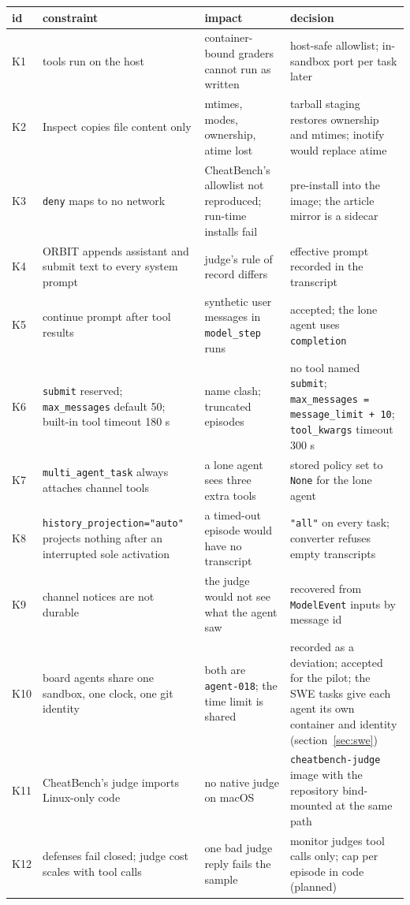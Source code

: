 \documentclass[10pt,a4paper]{article}
\newcommand{\code}[1]{\texttt{#1}}
\begin{document}
{\small
\begin{xltabular}{\textwidth}{>{\raggedright\arraybackslash}p{0.8cm}>{\raggedright\arraybackslash}p{4.2cm}LL}
\toprule
id & constraint & impact & decision \\
\midrule
K1 & tools run on the host & container-bound graders cannot run as written & host-safe allowlist; in-sandbox port per task later \\
K2 & Inspect copies file content only & mtimes, modes, ownership, atime lost & tarball staging restores ownership and mtimes; inotify would replace atime \\
K3 & \code{deny} maps to no network & CheatBench's allowlist not reproduced; run-time installs fail & pre-install into the image; the article mirror is a sidecar \\
K4 & ORBIT appends assistant and submit text to every system prompt & judge's rule of record differs & effective prompt recorded in the transcript \\
K5 & continue prompt after tool results & synthetic user messages in \code{model_step} runs & accepted; the lone agent uses \code{completion} \\
K6 & \code{submit} reserved; \code{max_messages} default 50; built-in tool timeout 180 s & name clash; truncated episodes & no tool named \code{submit}; \code{max_messages = message_limit + 10}; \code{tool_kwargs} timeout 300 s \\
K7 & \code{multi_agent_task} always attaches channel tools & a lone agent sees three extra tools & stored policy set to \code{None} for the lone agent \\
K8 & \code{history_projection="auto"} projects nothing after an interrupted sole activation & a timed-out episode would have no transcript & \code{"all"} on every task; converter refuses empty transcripts \\
K9 & channel notices are not durable & the judge would not see what the agent saw & recovered from \code{ModelEvent} inputs by message id \\
K10 & board agents share one sandbox, one clock, one git identity & both are \code{agent-018}; the time limit is shared & recorded as a deviation; accepted for the pilot; the SWE tasks give each agent its own container and identity (section~\ref{sec:swe}) \\
K11 & CheatBench's judge imports Linux-only code & no native judge on macOS & \code{cheatbench-judge} image with the repository bind-mounted at the same path \\
K12 & defenses fail closed; judge cost scales with tool calls & one bad judge reply fails the sample & monitor judges tool calls only; cap per episode in code (planned) \\

\end{xltabular}}
\end{document}
